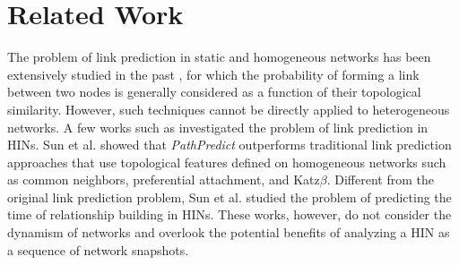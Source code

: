 \section{Related Work}


The problem of link prediction in static and homogeneous networks has been extensively studied in the past
\cite{liben2007link,wang2007local,lichtenwalter2010new,leroy2010cold,al2006link,al2011survey}, for which the probability of forming a link between two nodes is generally considered as a function of their topological similarity. However, such techniques cannot be directly applied to heterogeneous networks. A few works such as \cite{sun2011ASONAM,Sun:2012:HRP:2124295.2124373} investigated the problem of link prediction in HINs. Sun et al. \cite{sun2011ASONAM} showed that \textit{PathPredict} outperforms traditional link prediction approaches that use topological features defined on homogeneous networks such as %
common neighbors, preferential attachment, and Katz$\beta$. Different from the original link prediction problem, Sun et al. \cite{Sun:2012:HRP:2124295.2124373} studied the problem of predicting the time of relationship building in HINs. These works, however, do not consider the dynamism of networks and overlook the potential benefits of analyzing a HIN as a sequence of network snapshots.

